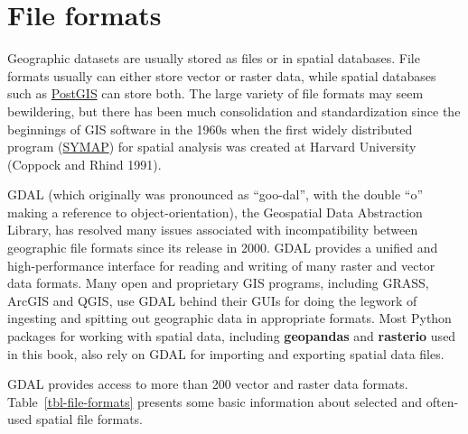 \documentclass[
  letterpaper,
]{krantz}
\begin{document}
\section{File formats}\label{sec-file-formats}

Geographic datasets are usually stored as files or in spatial databases.
File formats usually can either store vector or raster data, while
spatial databases such as \href{https://postgis.net/}{PostGIS} can store
both. The large variety of file formats may seem bewildering, but there
has been much consolidation and standardization since the beginnings of
GIS software in the 1960s when the first widely distributed program
(\href{https://news.harvard.edu/gazette/story/2011/10/the-invention-of-gis/}{SYMAP})
for spatial analysis was created at Harvard University (Coppock and
Rhind 1991).

GDAL (which originally was pronounced as ``goo-dal'', with the double
``o'' making a reference to object-orientation), the Geospatial Data
Abstraction Library, has resolved many issues associated with
incompatibility between geographic file formats since its release in
2000. GDAL provides a unified and high-performance interface for reading
and writing of many raster and vector data formats. Many open and
proprietary GIS programs, including GRASS, ArcGIS and QGIS, use GDAL
behind their GUIs for doing the legwork of ingesting and spitting out
geographic data in appropriate formats. Most Python packages for working
with spatial data, including \textbf{geopandas} and \textbf{rasterio}
used in this book, also rely on GDAL for importing and exporting spatial
data files.

GDAL provides access to more than 200 vector and raster data formats.
Table~\ref{tbl-file-formats} presents some basic information about
selected and often-used spatial file formats.
\end{document}
